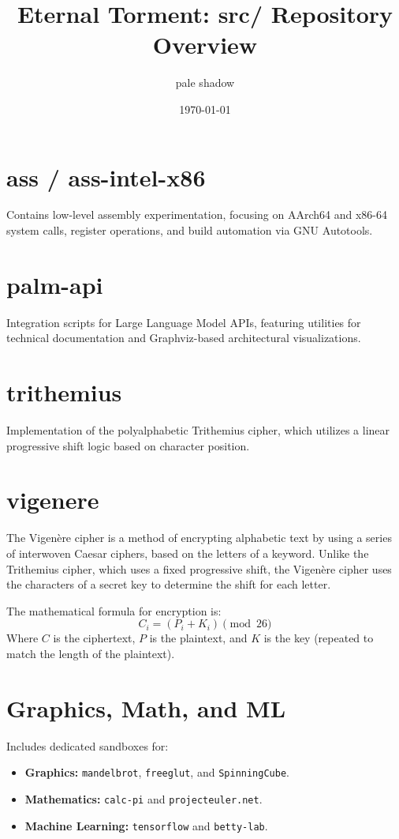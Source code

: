 \documentclass[11pt]{article}
\title{Eternal Torment: src/ Repository Overview}
\author{pale shadow}
\date{\today}
\begin{document}
\maketitle

\section{ass / ass-intel-x86}
Contains low-level assembly experimentation, focusing on AArch64 and x86-64 system calls, register operations, and build automation via GNU Autotools.

\section{palm-api}
Integration scripts for Large Language Model APIs, featuring utilities for technical documentation and Graphviz-based architectural visualizations.

\section{trithemius}
Implementation of the polyalphabetic Trithemius cipher, which utilizes a linear progressive shift logic based on character position.

\section{vigenere}
The Vigenère cipher is a method of encrypting alphabetic text by using a series of interwoven Caesar ciphers, based on the letters of a keyword. Unlike the Trithemius cipher, which uses a fixed progressive shift, the Vigenère cipher uses the characters of a secret key to determine the shift for each letter.

The mathematical formula for encryption is:
\begin{equation}
    C_i = (P_i + K_i) \pmod{26}
\end{equation}
Where $C$ is the ciphertext, $P$ is the plaintext, and $K$ is the key (repeated to match the length of the plaintext).

\section{Graphics, Math, and ML}
Includes dedicated sandboxes for:
\begin{itemize}
    \item \textbf{Graphics:} \texttt{mandelbrot}, \texttt{freeglut}, and \texttt{SpinningCube}.
    \item \textbf{Mathematics:} \texttt{calc-pi} and \texttt{projecteuler.net}.
    \item \textbf{Machine Learning:} \texttt{tensorflow} and \texttt{betty-lab}.
\end{itemize}
\end{document}
